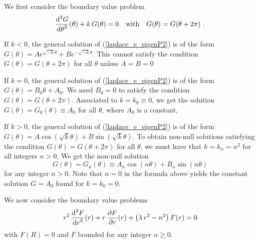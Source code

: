 We first consider the boundary value problem
\begin{equation} \label{laplace_e_eigenP2}
\frac{\displaystyle \mathrm{d}^{2}{G}} {\displaystyle \mathrm{d}{\theta}^{2}}(\theta) + k\,G(\theta) = 0 \quad \text{with} \quad
G(\theta) = G(\theta + 2\pi) \ .
\end{equation}

If $k<0$, the general solution of (\ref{laplace_e_eigenP2}) is of the form
$\displaystyle G(\theta) = A e^{\sqrt{-k}\theta} + B e^{-\sqrt{-k}\theta}$.
This cannot satisfy the condition $G(\theta) = G(\theta + 2\pi)$ for
all $\theta$ unless $A=B=0$

If $k=0$, the general solution of (\ref{laplace_e_eigenP2}) is of the form
$G(\theta) = B_0 \theta + A_0$.  We need $B_0 = 0$ to satisfy the
condition $G(\theta) = G(\theta + 2\pi)$.  Associated to $k = k_0 \equiv 0$,
we get the solution $G(\theta) = G_0(\theta) \equiv A_0$
for all $\theta$, where $A_0$ is a constant,

If $k>0$, the general solution of (\ref{laplace_e_eigenP2}) is of the form
$\displaystyle G(\theta) = A \cos\left(\sqrt{k}\theta\right)
+ B\sin\left(\sqrt{k}\theta\right)$.
To obtain non-null solutions satisfying the condition
$G(\theta) = G(\theta + 2\pi)$ for all $\theta$, we must have that
$\displaystyle k = k_n = n^2$ for all integers $n > 0$.  We get the
non-null solution
\[
G(\theta) = G_n(\theta) \equiv A_n \cos\left(n\theta\right)
+ B_n\sin\left(n\theta\right)
\]
for any integer $n > 0$.  Note that $n=0$ in the formula above yields the
constant solution $G = A_0$ found for $k=k_0=0$.

We now consider the boundary value problems
\begin{equation} \label{laplace_e_eigenP3}
r^2\,\frac{\displaystyle \mathrm{d}^{2}{F}} {\displaystyle \mathrm{d}{r}^{2}}(r) + r\, \frac{\partial{F}}{\partial r}(r)
+ \left(\lambda \, r^2 -n^2\right) F(r) = 0 \\
\end{equation}
with $F(R)=0$ and $F$ bounded for any integer $n\geq 0$.

